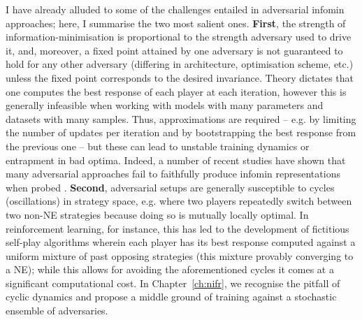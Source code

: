 I have already alluded to some of the challenges entailed in adversarial infomin
approaches; here, I summarise the two most salient ones.
%
\textbf{First}, the strength of information-minimisation is proportional to the strength
adversary used to drive it, and, moreover, a fixed point attained by one adversary is not
guaranteed to hold for any other adversary (differing in architecture, optimisation
scheme, etc.) unless the fixed point corresponds to the desired invariance. 
%
Theory dictates that one computes the best response of each player at each iteration,
however this is generally infeasible when working with models with many parameters and
datasets with many samples. 
%
Thus, approximations are required -- e.g. by limiting the number of updates per iteration
and by bootstrapping the best response from the previous one -- but these can lead to
unstable training dynamics or entrapment in bad optima. 
%
Indeed, a number of recent studies have shown that many adversarial approaches fail to
faithfully produce infomin representations when probed \citep{moyer2018invariant,
feng2019learning, balunovic2021fair}.
%
%
\textbf{Second}, adversarial setups are generally susceptible to cycles (oscillations) in strategy
space, e.g. where two players repeatedly switch between two non-NE strategies because doing so is
mutually locally optimal. 
%
In reinforcement learning, for instance, this has led to the development of fictitious self-play
algorithms \citep{brown1951iterative, heinrich2015fictitious, vinyals2019grandmaster} wherein each
player has its best response computed against a uniform mixture of past opposing strategies (this
mixture provably converging to a NE); while this allows for avoiding the aforementioned cycles it
comes at a significant computational cost.
%
In Chapter~\ref{ch:nifr}, we recognise the pitfall of cyclic dynamics and propose a middle ground
of training against a stochastic ensemble of adversaries.
% 




